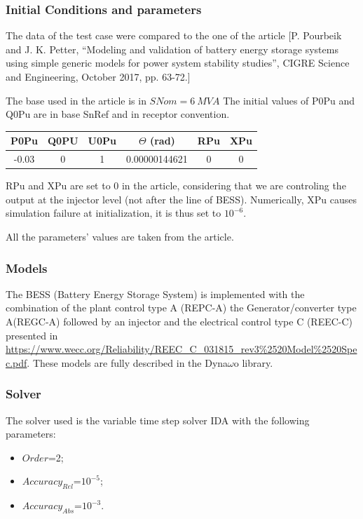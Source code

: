 \documentclass[a4paper, 12pt]{report}
\begin{document}
\subsubsection{Initial Conditions and parameters}
The data of the test case were compared to the one of the article
[P. Pourbeik and J. K. Petter, “Modeling and validation of battery energy storage systems
using simple generic models for power system stability studies”, CIGRE Science and
Engineering, October 2017, pp. 63-72.]

The base used in the article is in $SNom =6\ MVA$
The initial values of P0Pu and Q0Pu are in base SnRef and in receptor convention.

\begin{center}
\begin{tabular}{|c|c|c|c|c|c|}
  \hline
 P0Pu & Q0PU & U0Pu & $\Theta$ (rad) & RPu & XPu\\
  \hline
 -0.03 & 0 & 1 & 0.00000144621 & 0 & 0\\
  \hline
\end{tabular}
\end{center}

RPu and XPu are set to 0 in the article, considering that we are controling the output at the injector level (not after the line of BESS).
Numerically, XPu causes simulation failure at initialization, it is thus set to $10^{-6}$.

All the parameters' values are taken from the article.

\subsubsection{Models}

The BESS (Battery Energy Storage System) is implemented with the combination of the plant control type A (REPC-A) the Generator/converter type A(REGC-A) followed by an injector and the electrical control type C (REEC-C) presented in \url{https://www.wecc.org/Reliability/REEC\_C\_031815\_rev3\%2520Model\%2520Spec.pdf}.
These models are fully described in the Dyna$\omega$o library.

\subsubsection{Solver}

\par The solver used is the variable time step solver IDA with the following parameters:
\begin{itemize}
\item $Order$=2;
\item $Accuracy_{Rel}$=$10^{-5}$;
\item $Accuracy_{Abs}$=$10^{-3}$.
\end{itemize}
\end{document}

